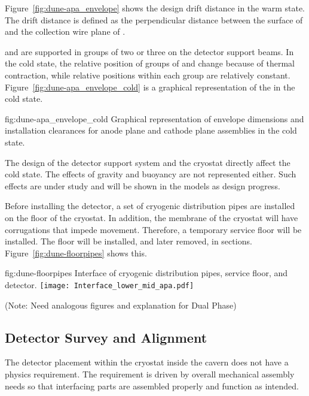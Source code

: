 Figure~\ref{fig:dune-apa_envelope} shows the design drift distance in
the warm state. The drift distance is defined as the perpendicular
distance between the surface of  and the collection wire
plane of .




 and  are supported in groups of two or three
on the detector support beams.  In the cold state, the relative
position of groups of  and  change because of
thermal contraction, while relative positions within each group are
relatively constant. Figure~\ref{fig:dune-apa_envelope_cold} is a
graphical representation of the  in the cold state. 
\begin{dunefigure}{fig:dune-apa_envelope_cold} {Graphical
    representation of envelope dimensions and installation clearances
    for anode plane and cathode plane assemblies in the cold state.}
\end{dunefigure}


The design of the detector support system and the cryostat directly
affect the cold state. The effects of gravity and buoyancy are not
represented either. Such effects are under study and will be shown in
the models as design progress.


Before installing the detector, a set of cryogenic distribution
pipes are installed on the floor of the cryostat. In addition, the
membrane of the cryostat will have corrugations that impede
movement. Therefore, a temporary service floor will be installed. The
floor will be installed, and later removed, in
sections. Figure~\ref{fig:dune-floorpipes} shows this.


\begin{dunefigure}{fig:dune-floorpipes} 
{Interface of cryogenic distribution pipes, service floor, and detector.}
  \texttt{[image: Interface\_lower\_mid\_apa.pdf]}
\end{dunefigure}




(Note: Need analogous figures and explanation for Dual Phase)

\subsection{Detector Survey and Alignment}
\label{sec:fdsp-coord-integ-survey}
The detector placement within the cryostat inside the
cavern does not have a physics requirement. The requirement is driven
by overall mechanical assembly needs so that interfacing
parts are assembled properly and function as intended.



